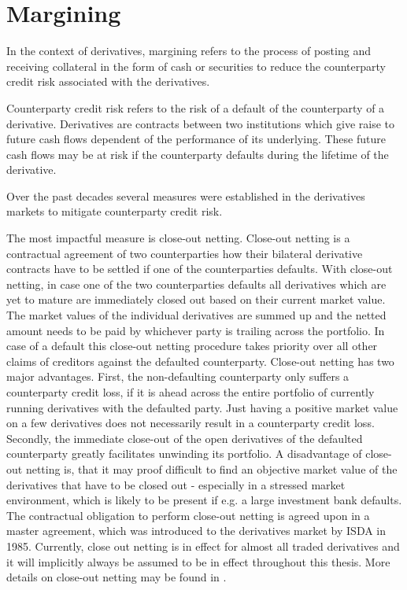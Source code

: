 \documentclass[../Thesis_AHoecherl.tex]{subfiles}
\begin{document}
\section{Margining}\label{Margining}

In the context of derivatives, margining refers to the process of posting and receiving collateral in the form of cash or securities to reduce the counterparty credit risk associated with the derivatives.

Counterparty credit risk refers to the risk of a default of the counterparty of a derivative. Derivatives are contracts between two institutions which give raise to future cash flows dependent of the performance of its underlying. These future cash flows may be at risk if the counterparty defaults during the lifetime of the derivative. 

Over the past decades several measures were established in the derivatives markets to mitigate counterparty credit risk.

The most impactful measure is close-out netting. Close-out netting is a contractual agreement of two counterparties how their bilateral derivative contracts have to be settled if one of the counterparties defaults. With close-out netting, in case one of the two counterparties defaults all derivatives which are yet to mature are immediately closed out based on their current market value. The market values of the individual derivatives are summed up and the netted amount needs to be paid by whichever party is trailing across the portfolio. In case of a default this close-out netting procedure takes priority over all other claims of creditors against the defaulted counterparty. Close-out netting has two major advantages. First, the non-defaulting counterparty only suffers a counterparty credit loss, if it is ahead across the entire portfolio of currently running derivatives with the defaulted party. Just having a positive market value on a few derivatives does not necessarily result in a counterparty credit loss. Secondly, the immediate close-out of the open derivatives of the defaulted counterparty greatly facilitates unwinding its portfolio. A disadvantage of close-out netting is, that it may proof difficult to find an objective market value of the derivatives that have to be closed out - especially in a stressed market environment, which is likely to be present if e.g. a large investment bank defaults. The contractual obligation to perform close-out netting is agreed upon in a master agreement, which was introduced to the derivatives market by ISDA in 1985. Currently, close out netting is in effect for almost all traded derivatives and it will implicitly always be assumed to be in effect throughout this thesis. More details on close-out netting may be found in \cite[Chapter~5]{gregory2015xva}.
\end{document}

